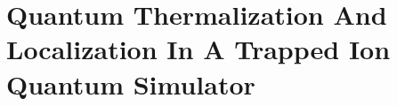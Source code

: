 \section{Quantum Thermalization And Localization In A Trapped Ion Quantum Simulator} %
\label{sec:quantum_thermalization_and_localization_in_a_trapped_ion_quantum_simulator}





